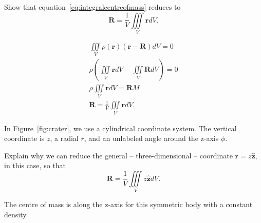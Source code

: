 \documentclass[addpoints]{exam}
\begin{document}
\begin{questions}
  \question[10] Show that
  equation~\ref{eq:integralcentreofmass} reduces to
  \begin{equation} 
    \mathbf{R} = \frac{1}{V}\iiint \limits _{V}\mathbf{r}dV.
    \label{eq:integralcentroid}
  \end{equation}
  \begin{solutionorlines}[3.5in]
    \begin{align*} 
      \iiint \limits _{V}\rho (\mathbf {r} )(\mathbf {r} -\mathbf {R} )dV=0\\
      \rho \left(\iiint \limits _{V}\mathbf {r}dV - \iiint \limits _{V}
      \mathbf {R}dV \right) =0\\
      \rho \iiint \limits _{V}\mathbf {r}dV = \mathbf{R}M\\
      \mathbf{R} = \frac{1}{V}\iiint \limits _{V}\mathbf{r}dV.
    \end{align*}
  \end{solutionorlines}
  In Figure~\ref{fig:crater}, we use a cylindrical coordinate
  system. The vertical coordinate is $z$, a radial $r$, and an unlabeled
  angle around the z-axis $\phi$.  
  
  \question[10] Explain why we can
  reduce the general -- three-dimensional -- coordinate
  $\mathbf{r}=z\hat{\mathbf{z}}$, in this case, so that
  \begin{equation} 
    \mathbf{R} = \frac{1}{V}\iiint \limits _{V}z\hat{\mathbf{z}}dV.
    \label{eq:centroidinz}
  \end{equation}
  \begin{solutionorlines}[2in]
    The centre of mass is along the z-axis for this symmetric body with
    a constant density.
  \end{solutionorlines}
  

\end{questions}
\end{document}
